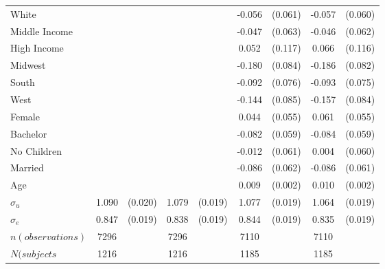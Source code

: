 \documentclass[12pt]{article}
\newcommand{\sym}[1]{\rlap{$^{#1}$}}
\begin{document}
\begin{table}[H]
{\begin{tabular}{l*{4}{cc}}
White       &                     &            &                     &            &      -0.056         &     (0.061)&      -0.057         &     (0.060)\\
Middle Income&                     &            &                     &            &      -0.047         &     (0.063)&      -0.046         &     (0.062)\\
High Income &                     &            &                     &            &       0.052         &     (0.117)&       0.066         &     (0.116)\\
Midwest     &                     &            &                     &            &      -0.180\sym{**} &     (0.084)&      -0.186\sym{**} &     (0.082)\\
South       &                     &            &                     &            &      -0.092         &     (0.076)&      -0.093         &     (0.075)\\
West        &                     &            &                     &            &      -0.144\sym{*}  &     (0.085)&      -0.157\sym{*}  &     (0.084)\\
Female      &                     &            &                     &            &       0.044         &     (0.055)&       0.061         &     (0.055)\\
Bachelor    &                     &            &                     &            &      -0.082         &     (0.059)&      -0.084         &     (0.059)\\
No Children &                     &            &                     &            &      -0.012         &     (0.061)&       0.004         &     (0.060)\\
Married     &                     &            &                     &            &      -0.086         &     (0.062)&      -0.086         &     (0.061)\\
Age         &                     &            &                     &            &       0.009\sym{***}&     (0.002)&       0.010\sym{***}&     (0.002)\\

$\sigma_u $    &       1.090\sym{***}&     (0.020)&       1.079\sym{***}&     (0.019)&       1.077\sym{***}&     (0.019)&       1.064\sym{***}&     (0.019)\\
$\sigma_e $     &       0.847\sym{***}&     (0.019)&       0.838\sym{***}&     (0.019)&       0.844\sym{***}&     (0.019)&       0.835\sym{***}&     (0.019)\\
\hline
\(n (observations)\)       &        7296         &            &        7296         &            &        7110         &            &        7110         &            \\
\(N (subjects\)       &        1216         &            &        1216         &            &        1185         &            &        1185         &            \\
\hline \hline
\end{tabular}
}





\end{table}
\end{document}
